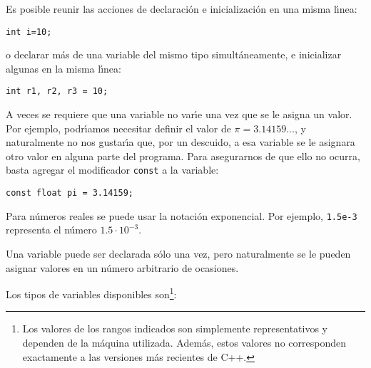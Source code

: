 Es posible reunir las acciones de declaraci{\'o}n e inicializaci{\'o}n en
una misma l{\'\i}nea:
\begin{verbatim}
int i=10;
\end{verbatim}
o declarar m\'as de una variable del mismo tipo
simult{\'a}neamente, e inicializar algunas en la misma l\'{\i}nea:
\begin{verbatim}
int r1, r2, r3 = 10;
\end{verbatim}

A veces se requiere que una variable 
no var{\'\i}e una vez que se le asigna un valor. Por ejemplo,
podr\'{\i}amos necesitar definir el valor de $\pi=3.14159...$, 
y naturalmente no
nos gustar\'{\i}a que, por un descuido, a esa variable se le asignara
otro valor en alguna parte del programa. Para asegurarnos de que ello
no ocurra, basta agregar el modificador \verb+const+ a la variable:
\begin{verbatim}
const float pi = 3.14159;
\end{verbatim}

Para n\'umeros reales se puede usar la notaci\'on exponencial. Por
ejemplo, \verb+1.5e-3+ representa el n\'umero $1.5\cdot 10^{-3}$.

Una variable puede ser declarada s\'olo una vez, pero naturalmente se
le pueden asignar valores en un n\'umero arbitrario de ocasiones. 

Los tipos de variables disponibles son\footnote{Los valores de los
rangos indicados son simplemente representativos y dependen de la
m{\'a}quina utilizada. Adem\'as, estos valores no corresponden
exactamente a las versiones m\'as recientes de C++.}:

